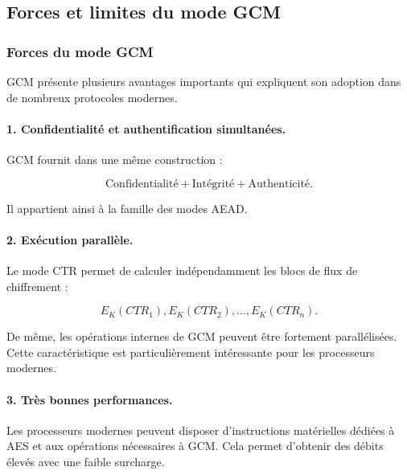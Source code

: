 \documentclass[12pt,a4paper]{article}
\begin{document}
\subsection{Forces et limites du mode GCM}
\label{subsec:gcm_forces_limites}

\subsubsection{Forces du mode GCM}

GCM présente plusieurs avantages importants qui expliquent son
adoption dans de nombreux protocoles modernes.

\paragraph{1. Confidentialité et authentification simultanées.}

GCM fournit dans une même construction :

\begin{equation}
\text{Confidentialité} + \text{Intégrité} + \text{Authenticité}.
\end{equation}

Il appartient ainsi à la famille des modes AEAD.

\paragraph{2. Exécution parallèle.}

Le mode CTR permet de calculer indépendamment les blocs de flux de
chiffrement :

\begin{equation}
E_K(CTR_1), E_K(CTR_2),\ldots,E_K(CTR_n).
\end{equation}

De même, les opérations internes de GCM peuvent être fortement
parallélisées. Cette caractéristique est particulièrement intéressante
pour les processeurs modernes.

\paragraph{3. Très bonnes performances.}

Les processeurs modernes peuvent disposer d'instructions matérielles
dédiées à AES et aux opérations nécessaires à GCM. Cela permet
d'obtenir des débits élevés avec une faible surcharge.
\end{document}
